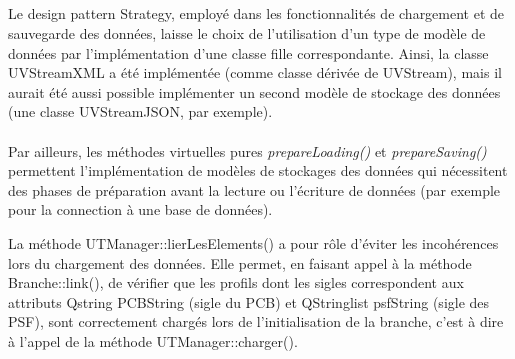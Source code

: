 \documentclass[a4paper,10pt,french]{report}
\begin{document}
		\subsubsection{}
			\paragraph{}
			\paragraph{}
			\paragraph{}
		\subsubsection{}
			\paragraph{}
			\paragraph{}
			\paragraph{}	
	\subsection{}\label{subsec:IIB}
	
	Le design pattern Strategy, employé dans les fonctionnalités de chargement et de sauvegarde des données, laisse le choix de l'utilisation d'un type de modèle de données par l'implémentation d'une classe fille correspondante.
	Ainsi, la classe UVStreamXML a été implémentée (comme classe dérivée de UVStream), mais il aurait été aussi possible implémenter un second modèle de stockage des données (une classe UVStreamJSON, par exemple).\\\\
	Par ailleurs, les méthodes virtuelles pures \emph{prepareLoading()} et \emph{prepareSaving()} permettent l'implémentation de modèles de stockages des données qui nécessitent des phases de préparation avant la lecture ou l'écriture de données (par exemple pour la connection à une base de données).
	
	La méthode UTManager::lierLesElements() a pour rôle d'éviter les incohérences lors du chargement des données.
	Elle permet, en faisant appel à la méthode Branche::link(), de vérifier que les profils dont les sigles correspondent aux attributs Qstring PCBString (sigle du PCB) et QStringlist psfString (sigle des PSF), sont correctement chargés lors de l'initialisation de la branche, c'est à dire à l'appel de la méthode UTManager::charger().\\\\
	
\end{document}
